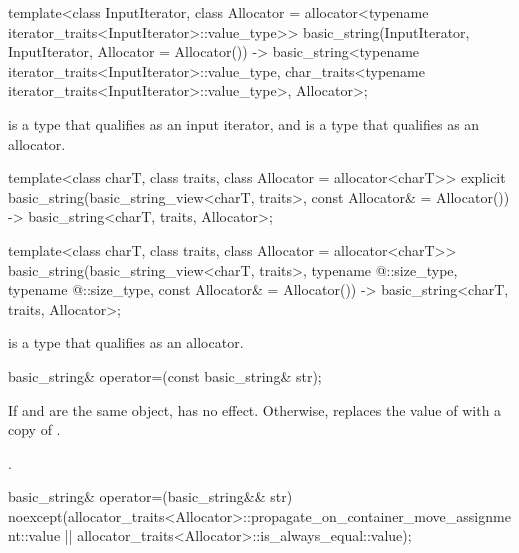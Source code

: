 \begin{itemdecl}
template<class InputIterator,
         class Allocator = allocator<typename iterator_traits<InputIterator>::value_type>>
  basic_string(InputIterator, InputIterator, Allocator = Allocator())
    -> basic_string<typename iterator_traits<InputIterator>::value_type,
                    char_traits<typename iterator_traits<InputIterator>::value_type>,
                    Allocator>;
\end{itemdecl}

\begin{itemdescr}
\pnum
\constraints
{} is a type that qualifies as an input iterator,
and  is a type that qualifies as an allocator.
\end{itemdescr}

\begin{itemdecl}
template<class charT,
         class traits,
         class Allocator = allocator<charT>>
  explicit basic_string(basic_string_view<charT, traits>, const Allocator& = Allocator())
    -> basic_string<charT, traits, Allocator>;

template<class charT,
         class traits,
         class Allocator = allocator<charT>>
  basic_string(basic_string_view<charT, traits>,
               typename @\seebelow@::size_type, typename @\seebelow@::size_type,
               const Allocator& = Allocator())
    -> basic_string<charT, traits, Allocator>;
\end{itemdecl}

\begin{itemdescr}
\pnum
\constraints
{} is a type that qualifies as
an allocator.
\end{itemdescr}

%
\begin{itemdecl}
basic_string& operator=(const basic_string& str);
\end{itemdecl}

\begin{itemdescr}
\pnum
\effects
If  and  are the same object, has no effect.
Otherwise, replaces the value of  with a copy of .

\pnum
\returns
{}.
\end{itemdescr}

%
\begin{itemdecl}
basic_string& operator=(basic_string&& str)
  noexcept(allocator_traits<Allocator>::propagate_on_container_move_assignment::value ||
           allocator_traits<Allocator>::is_always_equal::value);
\end{itemdecl}

